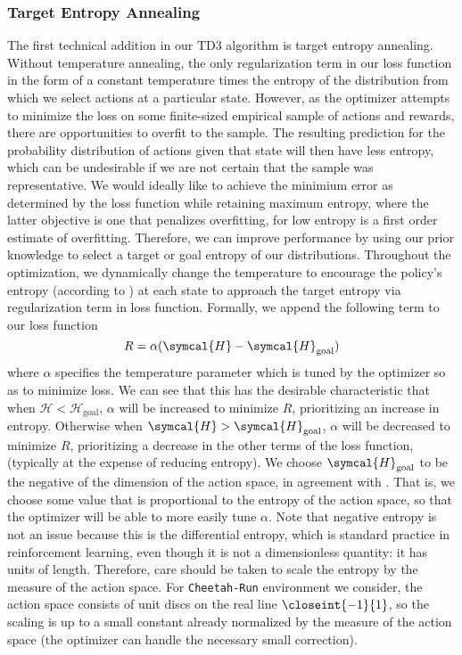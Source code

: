 \documentclass[base]{subfiles}
\begin{document}
\subsubsection{Target Entropy Annealing} \label{teakneel}
The first technical addition in our TD3 algorithm is target entropy annealing.
Without temperature annealing, the only regularization term in our loss function in the form of a constant temperature times the entropy of the distribution from which we select actions at a particular state.
However, as the optimizer attempts to minimize the loss on some finite-sized empirical sample of actions and rewards, there are opportunities to overfit to the sample.
The resulting prediction for the probability distribution of actions given that state will then have less entropy, which can be undesirable if we are not certain that the sample was representative.
We would ideally like to achieve the minimium error as determined by the loss function while retaining maximum entropy, where the latter objective is one that penalizes overfitting, for low entropy is a first order estimate of overfitting.
Therefore, we can improve performance by using our prior knowledge to select a target or goal entropy of our distributions.
Throughout the optimization, we dynamically change the temperature to encourage the policy's entropy (according to \cite{sac}) at each state to approach the target entropy via regularization term in loss function.
Formally, we append the following term to our loss function
\begin{equation}
R = \alpha (\symcal{H} - \symcal{H}_{\text{goal}})
\end{equation}
where \(\alpha\) specifies the temperature parameter which is tuned by the optimizer so as to minimize loss.
We can see that this has the desirable characteristic that when \(\mathcal{H} <  \mathcal{H}_{\text{goal}}\), \(\alpha\) will be increased to minimize \(R\), prioritizing an increase in entropy.
Otherwise when \(\symcal{H} > \symcal{H}_{\text{goal}}\), \(\alpha\) will be decreased to minimize \(R\), prioritizing a decrease in the other terms of the loss function, (typically at the expense of reducing entropy).
We choose \(\symcal{H}_{\text{goal}}\) to be the negative of the dimension of the action space, in agreement with \cite{kim2023}.
That is, we choose some value that is proportional to the entropy of the action space, so that the optimizer will be able to more easily tune \(\alpha\).
Note that negative entropy is not an issue because this is the differential entropy, which is standard practice in reinforcement learning, even though it is not a dimensionless quantity: it has units of length. 
Therefore, care should be taken to scale the entropy by the measure of the action space.
For \texttt{Cheetah-Run} environment we consider, the action space consists of unit discs on the real line \(\closeint{-1}{1}\), so the scaling is up to a small constant already normalized by the measure of the action space (the optimizer can handle the necessary small correction).
\end{document}
